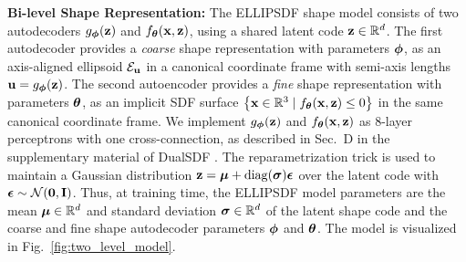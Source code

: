 {\vspace{1ex}\bf \noindent Bi-level Shape Representation: }%
The ELLIPSDF shape model consists of two autodecoders $g_{\boldsymbol{\phi}}(\mathbf{z})$ and $f_{\boldsymbol{\theta}}(\mathbf{x},\mathbf{z})$, using a shared latent code $\mathbf{z} \in \mathbb{R}^d$. The first autodecoder provides a \emph{coarse} shape representation with parameters $\boldsymbol{\phi}$, as an axis-aligned ellipsoid ${\cal E}_{\mathbf{u}}$ in a canonical coordinate frame with semi-axis lengths $\mathbf{u} = g_{\boldsymbol{\phi}}(\mathbf{z})$. The second autoencoder provides a \emph{fine} shape representation with parameters $\boldsymbol{\theta}$, as an implicit SDF surface $\left\{\mathbf{x} \in \mathbb{R}^3 \mid f_{\boldsymbol{\theta}}(\mathbf{x},\mathbf{z}) \leq 0\right\}$ in the same canonical coordinate frame. We implement $g_{\boldsymbol{\phi}}(\mathbf{z})$ and $f_{\boldsymbol{\theta}}(\mathbf{x},\mathbf{z})$ as $8$-layer perceptrons with one cross-connection, as described in Sec.~D in the supplementary material of DualSDF \cite{hao2020dualsdf}. The reparametrization trick \cite{kingma2013auto} is used to maintain a Gaussian distribution $\mathbf{z} = \boldsymbol{\mu} + \operatorname{diag}(\boldsymbol{\sigma}) \boldsymbol{\epsilon}$ over the latent code with $\boldsymbol{\epsilon} \sim \mathcal{N}(\bf{0},\bf{I})$. Thus, at training time, the ELLIPSDF model parameters are the mean $\boldsymbol{\mu} \in \mathbb{R}^d$ and standard deviation $\boldsymbol{\sigma} \in \mathbb{R}^d$ of the latent shape code and the coarse and fine shape autodecoder parameters $\boldsymbol{\phi}$ and $\boldsymbol{\theta}$. The model is visualized in Fig.~\ref{fig:two_level_model}. 







